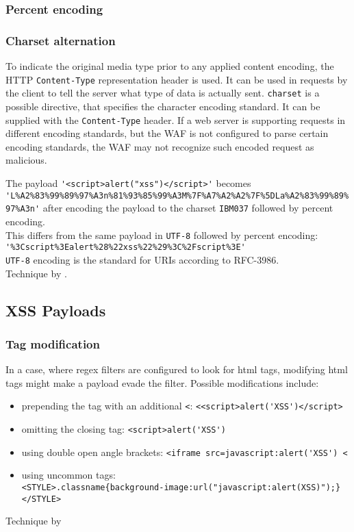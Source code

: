 \subsubsection{Percent encoding}


\subsubsection{Charset alternation}
To indicate the original media type prior to any applied content encoding, the HTTP \verb|Content-Type| representation header is used.
It can be used in requests by the client to tell the server what type of data is actually sent.
\verb|charset| is a possible directive, that specifies the character encoding standard.
It can be supplied with the \verb|Content-Type| header. \cite{http/contenttype}
If a web server is supporting requests in different encoding standards, but the WAF is not configured to parse certain encoding standards, the WAF may not recognize such encoded request as malicious.

The payload \verb|'<script>alert("xss")</script>'| becomes \\
\verb|'L%A2%83%99%89%97%A3n%81%93%85%99%A3M%7F%A7%A2%A2%7F%5DLa%A2%83%99%89%97%A3n'|
after encoding the payload to the charset \verb|IBM037| followed by percent encoding. \\
This differs from the same payload in \verb|UTF-8| followed by percent encoding: \\
\verb|'%3Cscript%3Ealert%28%22xss%22%29%3C%2Fscript%3E'| \\
\verb|UTF-8| encoding is the standard for URIs according to RFC-3986. \cite{rfc3986} \\
Technique by \cite{medium/allypetitt}.


\subsection{XSS Payloads}

\subsubsection{Tag modification}
In a case, where regex filters are configured to look for html tags, modifying html tags might make a payload evade the filter. Possible modifications include:
\begin{itemize}
	\item prepending the tag with an additional \verb|<|: \verb|<<script>alert('XSS')</script>|
	\item omitting the closing tag: \verb|<script>alert('XSS')|
	\item using double open angle brackets: \verb|<iframe src=javascript:alert('XSS') <|
	\item using uncommon tags: \\ \verb|<STYLE>.classname{background-image:url("javascript:alert(XSS)");}</STYLE>|
\end{itemize}
Technique by \cite{medium/allypetitt}

